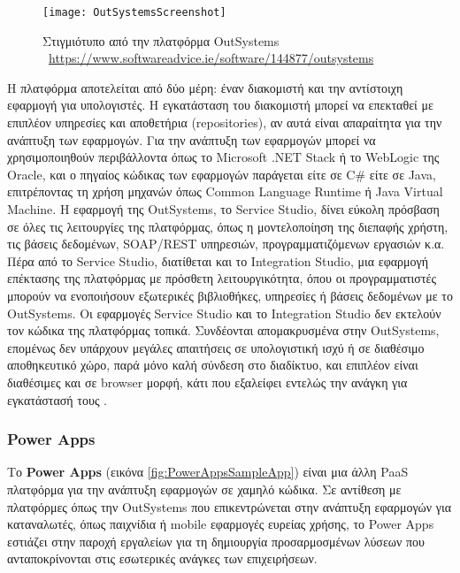             \begin{figure}[h!] \noindent \centering
                \texttt{[image: OutSystemsScreenshot]}
                \caption{\centering Στιγμιότυπο από την πλατφόρμα OutSystems \\ {\footnotesize \textcopyright\ \url{https://www.softwareadvice.ie/software/144877/outsystems}}}
                \label{fig:OutSystemsScreenshot}
            \end{figure}

            Η πλατφόρμα αποτελείται από δύο μέρη: έναν διακομιστή και την αντίστοιχη εφαρμογή για υπολογιστές. Η εγκατάσταση του διακομιστή μπορεί να επεκταθεί με επιπλέον υπηρεσίες και αποθετήρια (repositories), αν αυτά είναι απαραίτητα για την ανάπτυξη των εφαρμογών. Για την ανάπτυξη των εφαρμογών μπορεί να χρησιμοποιηθούν περιβάλλοντα όπως το Microsoft .NET Stack ή το WebLogic της Oracle, και ο πηγαίος κώδικας των εφαρμογών παράγεται είτε σε C\# είτε σε Java, επιτρέποντας τη χρήση μηχανών όπως Common Language Runtime ή Java Virtual Machine. Η εφαρμογή της OutSystems, το Service Studio, δίνει εύκολη πρόσβαση σε όλες τις λειτουργίες της πλατφόρμας, όπως η μοντελοποίηση της διεπαφής χρήστη, τις βάσεις δεδομένων, SOAP/REST υπηρεσιών, προγραμματιζόμενων εργασιών κ.α. Πέρα από το Service Studio, διατίθεται και το Integration Studio, μια εφαρμογή επέκτασης της πλατφόρμας με πρόσθετη λειτουργικότητα, όπου οι προγραμματιστές μπορούν να ενοποιήσουν εξωτερικές βιβλιοθήκες, υπηρεσίες ή βάσεις δεδομένων με το OutSystems. Οι εφαρμογές Service Studio και το Integration Studio δεν εκτελούν τον κώδικα της πλατφόρμας τοπικά. Συνδέονται απομακρυσμένα στην OutSystems, επομένως δεν υπάρχουν μεγάλες απαιτήσεις σε υπολογιστική ισχύ ή σε διαθέσιμο αποθηκευτικό χώρο, παρά μόνο καλή σύνδεση στο διαδίκτυο, και επιπλέον είναι διαθέσιμες και σε browser μορφή, κάτι που εξαλείφει εντελώς την ανάγκη για εγκατάστασή τους \cite{OutSystemsGolovin} \cite{OutSystemsSite}.

            \subsubsection{Power Apps}
                Το \textbf{Power Apps} (εικόνα \ref{fig:PowerAppsSampleApp}) είναι μια άλλη PaaS πλατφόρμα για την ανάπτυξη εφαρμογών σε χαμηλό κώδικα. Σε αντίθεση με πλατφόρμες όπως την OutSystems που επικεντρώνεται στην ανάπτυξη εφαρμογών για καταναλωτές, όπως παιχνίδια ή mobile εφαρμογές ευρείας χρήσης, το Power Apps εστιάζει στην παροχή εργαλείων για τη δημιουργία προσαρμοσμένων λύσεων που ανταποκρίνονται στις εσωτερικές ανάγκες των επιχειρήσεων.

